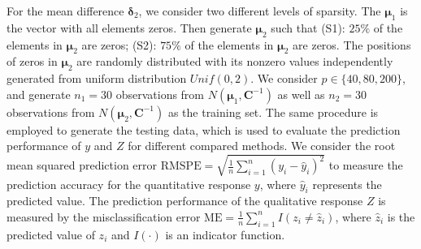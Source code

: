 \documentclass[12pt]{article}
\begin{document}
For the mean difference $\bm \delta_2$, we consider two different levels of sparsity.
The $\bm \mu_1$ is the vector with all elements zeros.
Then generate $\bm\mu_2$ such that (S1): $25\%$ of the elements in $\bm\mu_2$ are zeros; (S2): $75\%$ of the elements in $\bm\mu_2$ are zeros.
The positions of zeros in $\bm \mu_{2}$ are randomly distributed with its
nonzero values independently generated from uniform distribution $Unif(0, 2)$.
We consider $p \in \{40, 80, 200\}$, and generate $n_1 = 30$ observations from $N(\bm \mu_{1}, \bm C^{-1})$ as well as
$n_2 = 30$ observations from $N(\bm \mu_{2}, \bm C^{-1})$ as the training set.
The same procedure is employed to generate the testing data, which is used to evaluate the prediction performance of $y$ and $Z$ for different compared methods.
We consider the root mean squared prediction error $\textrm{RMSPE} = \sqrt{\frac{1}{n} \sum_{i=1}^{n} (y_{i} - \hat{y}_{i})^2}$ to measure the prediction accuracy for the quantitative response $y$, where $\hat{y}_{i}$ represents the predicted value.
The prediction performance of the qualitative response $Z$ is measured by the misclassification error $\textrm{ME} = \frac{1}{n}\sum_{i=1}^n I(z_{i} \neq \hat{z}_{i})$, where $\hat{z}_{i}$ is the predicted value of $z_{i}$ and $I(\cdot)$ is an indicator function.
\end{document}
